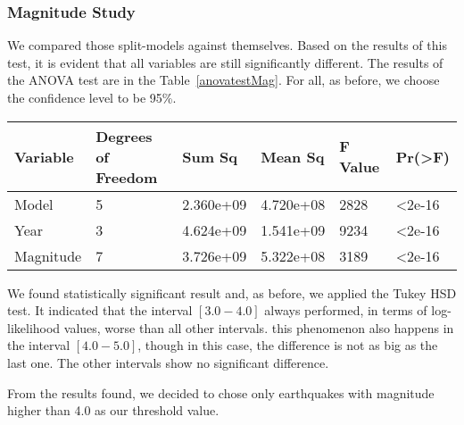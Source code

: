 \subsubsection{Magnitude Study}

We compared those split-models against themselves. Based on the
results of this test, it is evident that all variables are still
significantly different. The results of the ANOVA test are in the
Table~\ref{anovatestMag}. For all, as before, we choose the confidence
level to be 95\%.

\begin{table*}[!ht]
  \centering
  \begin{tabular}{|l|l|l|l|l|l|}
    \hline
	{Variable} & {Degrees of Freedom} & {Sum Sq}    & {Mean Sq}   & {F Value} & {Pr(\textgreater F)} \\
	\hline
	Model       & 5            	  & 2.360e+09      & 4.720e+08     & 2828     & \textless2e-16     \\
	\hline
	Year        & 3                  & 4.624e+09   & 1.541e+09    & 9234     & \textless2e-16     \\
	\hline
	Magnitude   & 7                  & 3.726e+09   & 5.322e+08    & 3189     & \textless2e-16	\\    
	\hline
  \end{tabular}
  \caption{ANOVA Test Results Values - Magnitude Study.}
  \label{anovatestMag}
\end{table*}

We found statistically significant result and, as before, we applied
the Tukey HSD test. It indicated that the interval $[3.0-4.0]$ always
performed, in terms of log-likelihood values, worse than all other
intervals. this phenomenon also happens in the interval $[4.0-5.0]$,
though in this case, the difference is not as big as the last one. The
other intervals show no significant difference.

From the results found, we decided to chose only earthquakes with
magnitude higher than 4.0 as our threshold value.





